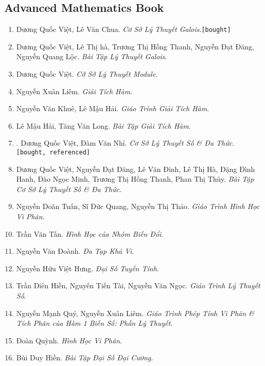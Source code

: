 \documentclass{article}
\numberwithin{equation}{section}
\begin{document}
\subsection{Advanced Mathematics Book}
\begin{enumerate}
	\item Dương Quốc Việt, Lê Văn Chua. \textit{Cơ Sở Lý Thuyết Galois}.\hfill\texttt{[bought]}
	\item Dương Quốc Việt, Lê Thị hà, Trương Thị Hồng Thanh, Nguyễn Đạt Đăng, Nguyễn Quang Lộc. \textit{Bài Tập Lý Thuyết Galois}.
	\item Dương Quốc Việt. \textit{Cở Sở Lý Thuyết Module}.
	\item Nguyễn Xuân Liêm. \textit{Giải Tích Hàm}.
	\item Nguyễn Văn Khuê, Lê Mậu Hải. \textit{Giáo Trình Giải Tích Hàm}.
	\item Lê Mậu Hải, Tăng Văn Long. \textit{Bài Tập Giải Tích Hàm}.
	\item \cite{Viet_Nhi2022}. Dương Quốc Việt, Đàm Văn Nhỉ. \textit{Cơ Sở Lý Thuyết Số \& Đa Thức}.\hfill\texttt{[bought, referenced]}
	\item Dương Quốc Việt, Nguyễn Đạt Đăng, Lê Văn Đinh, Lê Thị Hà, Đặng Đình Hanh, Đào Ngọc Minh, Trương Thị Hồng Thanh, Phan Thị Thủy. \textit{Bài Tập Cơ Sở Lý Thuyết Số \& Đa Thức}.
	\item Nguyễn Doãn Tuấn, Sĩ Đức Quang, Nguyễn Thị Thảo. \textit{Giáo Trình Hình Học Vi Phân}.
	\item Trần Văn Tấn. \textit{Hình Học của Nhóm Biến Đổi}.
	\item Nguyễn Văn Đoành. \textit{Đa Tạp Khả Vi}.
	\item Nguyễn Hữu Việt Hưng. \textit{Đại Số Tuyến Tính}.
	\item Trần Diên Hiền, Nguyến Tiến Tài, Nguyễn Văn Ngọc. \textit{Giáo Trình Lý Thuyết Số}.
	\item Nguyễn Mạnh Quý, Nguyễn Xuân Liêm. \textit{Giáo Trình Phép Tính Vi Phân \& Tích Phân của Hàm 1 Biến Số: Phần Lý Thuyết}.
	\item Đoàn Quỳnh. \textit{Hình Học Vi Phân}.
	\item Bùi Duy Hiền. \textit{Bài Tập Đại Số Đại Cương}.
\end{enumerate}

\end{document}
